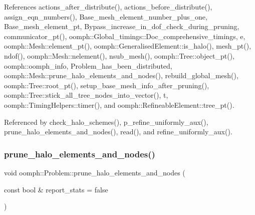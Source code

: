 References actions\+\_\+after\+\_\+distribute(), actions\+\_\+before\+\_\+distribute(), assign\+\_\+eqn\+\_\+numbers(), Base\+\_\+mesh\+\_\+element\+\_\+number\+\_\+plus\+\_\+one, Base\+\_\+mesh\+\_\+element\+\_\+pt, Bypass\+\_\+increase\+\_\+in\+\_\+dof\+\_\+check\+\_\+during\+\_\+pruning, communicator\+\_\+pt(), oomph\+::\+Global\+\_\+timings\+::\+Doc\+\_\+comprehensive\+\_\+timings, e, oomph\+::\+Mesh\+::element\+\_\+pt(), oomph\+::\+Generalised\+Element\+::is\+\_\+halo(), mesh\+\_\+pt(), ndof(), oomph\+::\+Mesh\+::nelement(), nsub\+\_\+mesh(), oomph\+::\+Tree\+::object\+\_\+pt(), oomph\+::oomph\+\_\+info, Problem\+\_\+has\+\_\+been\+\_\+distributed, oomph\+::\+Mesh\+::prune\+\_\+halo\+\_\+elements\+\_\+and\+\_\+nodes(), rebuild\+\_\+global\+\_\+mesh(), oomph\+::\+Tree\+::root\+\_\+pt(), setup\+\_\+base\+\_\+mesh\+\_\+info\+\_\+after\+\_\+pruning(), oomph\+::\+Tree\+::stick\+\_\+all\+\_\+tree\+\_\+nodes\+\_\+into\+\_\+vector(), t, oomph\+::\+Timing\+Helpers\+::timer(), and oomph\+::\+Refineable\+Element\+::tree\+\_\+pt().



Referenced by check\+\_\+halo\+\_\+schemes(), p\+\_\+refine\+\_\+uniformly\+\_\+aux(), prune\+\_\+halo\+\_\+elements\+\_\+and\+\_\+nodes(), read(), and refine\+\_\+uniformly\+\_\+aux().

\mbox{\label{classoomph_1_1Problem_a977f74f132157959d30e82cfcad41a97}} 
\subsubsection{\texorpdfstring{prune\+\_\+halo\+\_\+elements\+\_\+and\+\_\+nodes()}{prune\_halo\_elements\_and\_nodes()}\hspace{0.1cm}{\footnotesize\ttfamily [2/2]}}
{\footnotesize\ttfamily void oomph\+::\+Problem\+::prune\+\_\+halo\+\_\+elements\+\_\+and\+\_\+nodes (\begin{DoxyParamCaption}\item[{const bool \&}]{report\+\_\+stats = {\ttfamily false} }\end{DoxyParamCaption})\hspace{0.3cm}{\ttfamily [inline]}}



